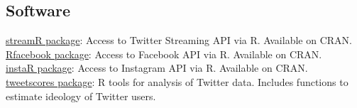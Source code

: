 \documentclass[margin,line,11pt]{resume}
\newcommand{\nl}{\vspace{0.10in}\\}
\begin{document}
\begin{resume}
   
    
    

    
   
    




    
        \section{\mysidestyle Software}
    
\href{http://cran.r-project.org/web/packages/streamR/}{streamR package}: Access to Twitter Streaming API via R. Available on CRAN. \nl
\href{http://cran.r-project.org/web/packages/Rfacebook/index.html}{Rfacebook package}: Access to Facebook API via R. Available on CRAN. \nl
\href{http://cran.r-project.org/web/packages/instaR/index.html}{instaR package}: Access to Instagram API via R. Available on CRAN. \nl
\href{http://www.tweetscores.com}{tweetscores package}: R tools for analysis of Twitter data. Includes functions to estimate ideology of Twitter users.
\newpage


\end{resume}
\end{document}

